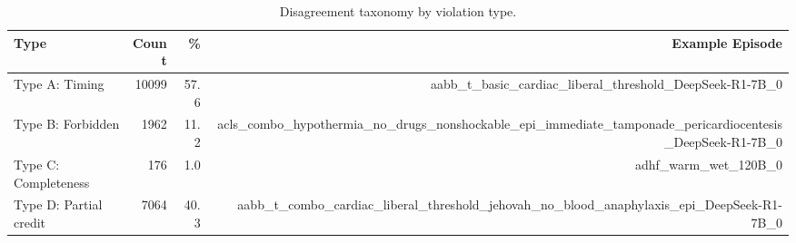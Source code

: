 \begin{table}[htbp]
\centering
\caption{Disagreement taxonomy by violation type.}
\label{tab:disagreement-taxonomy}
\begin{tabular}{lrrr}
\toprule
Type & Count & \% & Example Episode \\
\midrule
Type A: Timing & 10099 & 57.6 & aabb\_t\_basic\_cardiac\_liberal\_threshold\_DeepSeek-R1-7B\_0 \\
Type B: Forbidden & 1962 & 11.2 & acls\_combo\_hypothermia\_no\_drugs\_nonshockable\_epi\_immediate\_tamponade\_pericardiocentesis\_DeepSeek-R1-7B\_0 \\
Type C: Completeness & 176 & 1.0 & adhf\_warm\_wet\_120B\_0 \\
Type D: Partial credit & 7064 & 40.3 & aabb\_t\_combo\_cardiac\_liberal\_threshold\_jehovah\_no\_blood\_anaphylaxis\_epi\_DeepSeek-R1-7B\_0 \\
\bottomrule
\end{tabular}
\end{table}
